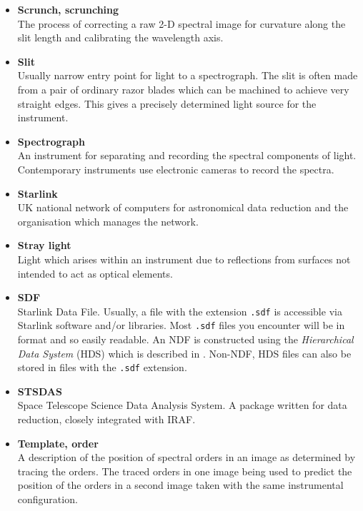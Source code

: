 {{\begin{itemize}
\item {\bf\label{gl_scrunch}Scrunch, scrunching}\\
      The process of correcting a raw 2-D spectral image for curvature 
      along the slit length and calibrating the wavelength axis.

\item {\bf\label{gl_slit}Slit}\\
      Usually narrow entry point for light to a spectrograph.
      The slit is often made from a pair of ordinary razor blades which can
      be machined to achieve very straight edges.  This gives a precisely
      determined light source for the instrument.

\item {\bf\label{gl_spectrograph}Spectrograph}\\
      An instrument for separating and recording the spectral components of
      light.  Contemporary instruments use electronic cameras to record the
      spectra.

\item {\bf\label{gl_starlink}Starlink}\\
      UK national network of computers for astronomical data reduction
      and the organisation which manages the network.

\item {\bf\label{gl_stray_light}Stray light}\\
      Light which arises within an instrument due to reflections from
      surfaces not intended to act as optical elements.

\item {\bf\label{gl_sdf}SDF}\\
      Starlink Data File.  Usually, a file with the extension \verb+.sdf+
      is accessible via Starlink software and/or libraries.
      Most \verb+.sdf+ files you encounter will be in 
      format and so easily readable.  An NDF is constructed using the
      {\sl Hierarchical Data System} (HDS) which is described in
      \cite{hds}.
      Non-NDF, HDS files can also be stored in
      files with the \verb+.sdf+ extension.

\item {\bf\label{gl_stsdas}STSDAS}\\
      Space Telescope Science Data Analysis System.  A package written
      for  data reduction, closely integrated with IRAF.

\item {\bf\label{gl_template_order}Template, order}\\
      A description of the position of spectral orders in an image
      as determined by tracing the orders.  The traced orders in one image
      being used to predict the position of the orders in a second image
      taken with the same instrumental configuration.


\end{itemize}}}
